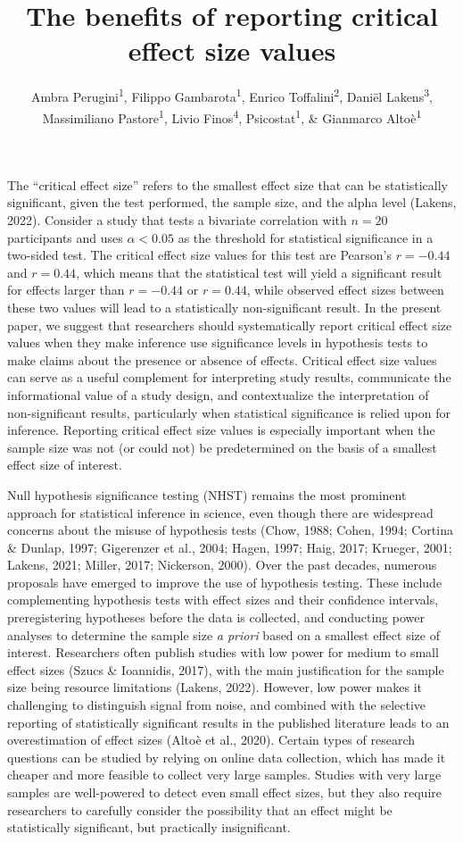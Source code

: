 \documentclass[
  man]{apa7}
\title{The benefits of reporting critical effect size values}
\author{Ambra Perugini\textsuperscript{1}, Filippo Gambarota\textsuperscript{1}, Enrico Toffalini\textsuperscript{2}, Daniël Lakens\textsuperscript{3}, Massimiliano Pastore\textsuperscript{1}, Livio Finos\textsuperscript{4}, Psicostat\textsuperscript{1}, \& Gianmarco Altoè\textsuperscript{1}}
\date{}
\affiliation{\vspace{0.5cm}\textsuperscript{1} Department of Developmental and Social Psychology, University of Padova, Italy\\\textsuperscript{2} Department of General Psychology, University of Padova, Italy\\\textsuperscript{3} Eindhoven University of Technology, Netherlands\\\textsuperscript{4} Department of Statistics, University of Padova, Italy}
\begin{document}
\maketitle

The ``critical effect size'' refers to the smallest effect size that can be statistically significant, given the test performed, the sample size, and the alpha level (Lakens, 2022). Consider a study that tests a bivariate correlation with \(n = 20\) participants and uses \(\alpha < 0.05\) as the threshold for statistical significance in a two-sided test. The critical effect size values for this test are Pearson's \(r = -0.44\) and \(r = 0.44\), which means that the statistical test will yield a significant result for effects larger than \(r = -0.44\) or \(r = 0.44\), while observed effect sizes between these two values will lead to a statistically non-significant result. In the present paper, we suggest that researchers should systematically report critical effect size values when they make inference use significance levels in hypothesis tests to make claims about the presence or absence of effects. Critical effect size values can serve as a useful complement for interpreting study results, communicate the informational value of a study design, and contextualize the interpretation of non-significant results, particularly when statistical significance is relied upon for inference. Reporting critical effect size values is especially important when the sample size was not (or could not) be predetermined on the basis of a smallest effect size of interest.

Null hypothesis significance testing (NHST) remains the most prominent approach for statistical inference in science, even though there are widespread concerns about the misuse of hypothesis tests (Chow, 1988; Cohen, 1994; Cortina \& Dunlap, 1997; Gigerenzer et al., 2004; Hagen, 1997; Haig, 2017; Krueger, 2001; Lakens, 2021; Miller, 2017; Nickerson, 2000). Over the past decades, numerous proposals have emerged to improve the use of hypothesis testing. These include complementing hypothesis tests with effect sizes and their confidence intervals, preregistering hypotheses before the data is collected, and conducting power analyses to determine the sample size \textit{a priori} based on a smallest effect size of interest. Researchers often publish studies with low power for medium to small effect sizes (Szucs \& Ioannidis, 2017), with the main justification for the sample size being resource limitations (Lakens, 2022). However, low power makes it challenging to distinguish signal from noise, and combined with the selective reporting of statistically significant results in the published literature leads to an overestimation of effect sizes (Altoè et al., 2020). Certain types of research questions can be studied by relying on online data collection, which has made it cheaper and more feasible to collect very large samples. Studies with very large samples are well-powered to detect even small effect sizes, but they also require researchers to carefully consider the possibility that an effect might be statistically significant, but practically insignificant.
\end{document}
